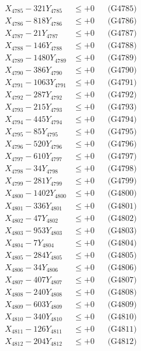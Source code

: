 \documentclass[a4paper,10pt]{article}
\begin{document}
{\begin{align}
X_{4785} - 321Y_{4785} &\leq +0 && \text{(G4785)} \\
X_{4786} - 818Y_{4786} &\leq +0 && \text{(G4786)} \\
X_{4787} - 21Y_{4787} &\leq +0 && \text{(G4787)} \\
X_{4788} - 146Y_{4788} &\leq +0 && \text{(G4788)} \\
X_{4789} - 1480Y_{4789} &\leq +0 && \text{(G4789)} \\
X_{4790} - 386Y_{4790} &\leq +0 && \text{(G4790)} \\
\allowbreak
X_{4791} - 1063Y_{4791} &\leq +0 && \text{(G4791)} \\
X_{4792} - 287Y_{4792} &\leq +0 && \text{(G4792)} \\
X_{4793} - 215Y_{4793} &\leq +0 && \text{(G4793)} \\
X_{4794} - 445Y_{4794} &\leq +0 && \text{(G4794)} \\
X_{4795} - 85Y_{4795} &\leq +0 && \text{(G4795)} \\
X_{4796} - 520Y_{4796} &\leq +0 && \text{(G4796)} \\
X_{4797} - 610Y_{4797} &\leq +0 && \text{(G4797)} \\
X_{4798} - 34Y_{4798} &\leq +0 && \text{(G4798)} \\
X_{4799} - 281Y_{4799} &\leq +0 && \text{(G4799)} \\
X_{4800} - 1402Y_{4800} &\leq +0 && \text{(G4800)} \\
\allowbreak
X_{4801} - 336Y_{4801} &\leq +0 && \text{(G4801)} \\
X_{4802} - 47Y_{4802} &\leq +0 && \text{(G4802)} \\
X_{4803} - 953Y_{4803} &\leq +0 && \text{(G4803)} \\
X_{4804} - 7Y_{4804} &\leq +0 && \text{(G4804)} \\
X_{4805} - 284Y_{4805} &\leq +0 && \text{(G4805)} \\
X_{4806} - 34Y_{4806} &\leq +0 && \text{(G4806)} \\
X_{4807} - 407Y_{4807} &\leq +0 && \text{(G4807)} \\
X_{4808} - 240Y_{4808} &\leq +0 && \text{(G4808)} \\
X_{4809} - 603Y_{4809} &\leq +0 && \text{(G4809)} \\
X_{4810} - 340Y_{4810} &\leq +0 && \text{(G4810)} \\
\allowbreak
X_{4811} - 126Y_{4811} &\leq +0 && \text{(G4811)} \\
X_{4812} - 204Y_{4812} &\leq +0 && \text{(G4812)} \\

\end{align}}
\end{document}
